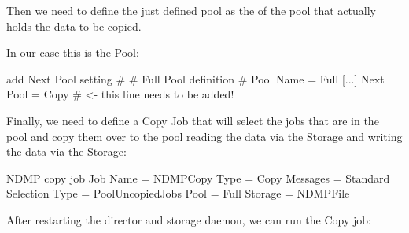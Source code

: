Then we need to define the just defined pool as the  of the pool
that actually holds the data to be copied.

In our case this is the  Pool:
\begin{bconfig}{add Next Pool setting}
#
# Full Pool definition
#
Pool {
  Name = Full
  [...]
  Next Pool = Copy   # <- this line needs to be added!
}
\end{bconfig}


Finally, we need to define a Copy Job that will select the jobs that are in the  pool
and copy them over to the  pool 
reading the data via the  Storage
and writing the data via the  Storage:

\begin{bconfig}{NDMP copy job}
Job {
   Name = NDMPCopy
   Type = Copy
   Messages = Standard
   Selection Type = PoolUncopiedJobs
   Pool = Full
   Storage = NDMPFile
}
\end{bconfig}

After restarting the director and storage daemon, we can run the Copy job:

